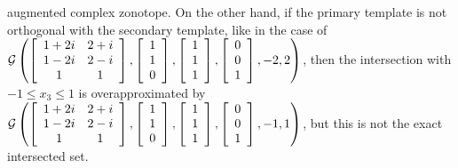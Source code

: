 augmented complex zonotope.  On the other hand, if the primary
template is not orthogonal with the secondary template, like in the
case of $\mathcal{G}\left(\left[\begin{array}{cc}1+2i & 2+i\\1-2i & 2-i\\1 &
1\end{array}\right],\left[\begin{array}{c}1\\1\\0\end{array}\right],\left[\begin{array}{c}1\\1\\1\end{array}\right],\left[\begin{array}{c}0\\0\\1\end{array}\right],-2,2\right)$, then the
intersection with $-1\leq x_3\leq 1$ is overapproximated by
$\mathcal{G}\left(\left[\begin{array}{cc}1+2i & 2+i\\1-2i & 2-i\\1 &
1\end{array}\right],\left[\begin{array}{c}1\\1\\0\end{array}\right],\left[\begin{array}{c}1\\1\\1\end{array}\right],\left[\begin{array}{c}0\\0\\1\end{array}\right],-1,1\right)$, but this is not
the exact intersected set.


